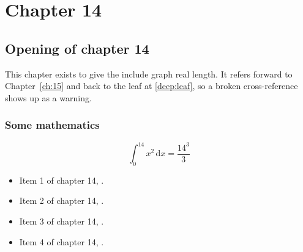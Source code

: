 \chapter{Chapter 14}
\label{ch:14}
\section{Opening of chapter 14}
This chapter exists to give the include graph real length. It refers
forward to Chapter~\ref{ch:15} and back to the leaf
at \ref{deep:leaf}, so a broken cross-reference shows up as a warning.

\subsection{Some mathematics}
\begin{equation}
  \int_0^{14} x^{2} \, \mathrm{d}x = \frac{14^{3}}{3}
\end{equation}

\begin{itemize}
  \item Item 1 of chapter 14, .
  \item Item 2 of chapter 14, .
  \item Item 3 of chapter 14, .
  \item Item 4 of chapter 14, .
\end{itemize}
